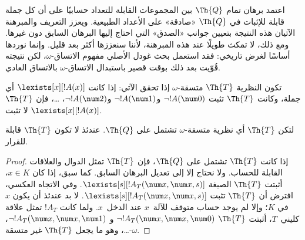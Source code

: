 \documentclass[../../../include/open-logic-section]{subfiles}
\begin{document}


\begin{explain}
اعتمد برهان تمام $\Th{Q}$ بين المجموعات القابلة للتعداد حسابيًا على
أن كل جملة قابلة للإثبات في $\Th{Q}$ «صادقة» على الأعداد الطبيعية.
ويعزز التعريف والمبرهنة الآتيان هذه النتيجة بتعيين جوانب «الصدق» التي
احتاج إليها البرهان السابق دون غيرها. ومع ذلك، لا تمكث طويلًا عند هذه
المبرهنة، لأننا سنعززها أكثر بعد قليل. وإنما نوردها أساسًا لغرض
تاريخي: فقد استعمل بحث غودل الأصلي مفهوم الاتساق-$\omega$، لكن نتيجته
قُوّيت بعد ذلك بوقت قصير باستبدال الاتساق-$\omega$ بالاتساق العادي.
\end{explain}

\begin{defn}
تكون النظرية $\Th{T}$ متسقة-$\omega$ إذا تحقق الآتي: إذا كانت
$\lexists[x][!A(x)]$ أي جملة، وكانت $\Th{T}$ تثبت
$\lnot !A(\num 0)$ و$\lnot !A(\num 1)$ و$\lnot !A(\num 2)$،
\dots، فإن $\Th{T}$ لا تثبت $\lexists[x][!A(x)]$.
\end{defn}

\begin{thm}
  لتكن $\Th{T}$ أي نظرية متسقة-$\omega$ تشتمل على $\Th{Q}$. عندئذ
  لا تكون $\Th{T}$ قابلة للقرار.
\end{thm}

\begin{proof}
إذا كانت $\Th{T}$ تشتمل على $\Th{Q}$، فإن $\Th{T}$ تمثل الدوال
والعلاقات القابلة للحساب. ولا نحتاج إلا إلى تعديل البرهان السابق. كما
سبق، إذا كان $x\in K$، أثبتت $\Th{T}$ الصيغة
$\lexists[s][!A_T(\num x,\num x,s)]$. وفي الاتجاه العكسي، افترض أن
$\Th{T}$ تثبت $\lexists[s][!A_T(\num x,\num x,s)]$. لا بد عندئذ أن
يكون $x$ في $K$؛ وإلا لم يوجد حساب متوقف للآلة~$x$ عند الدخل~$x$.
ولما كانت $!A_T$ تمثل علاقة كليني~$T$، أثبتت $\Th{T}$
$\lnot !A_T(\num x,\num x,\num 0)$ و
$\lnot !A_T(\num x,\num x,\num 1)$، \dots، وهو ما يجعل
$\Th{T}$ غير متسقة-$\omega$.
\end{proof}
\end{document}
